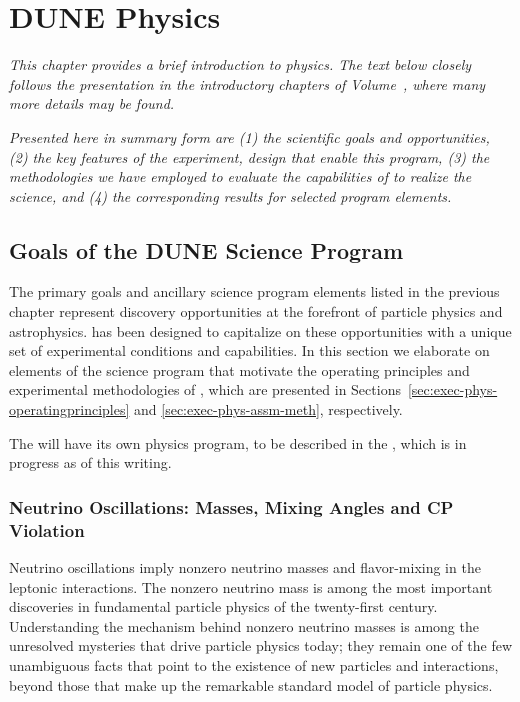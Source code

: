 \chapter{DUNE Physics}
\label{ch:exec-phys}


\textit{
This chapter provides a brief introduction to  physics.  The text below closely follows the presentation in the introductory chapters of Volume~\volnumberphysics{}, 
where many more details may be found.}


\textit{Presented here in summary form are   
(1) the scientific goals and opportunities, 
(2) the key features of the experiment, 
design that enable this program, 
(3) the methodologies we have 
employed to evaluate the capabilities of  to realize 
the science, and
(4) the corresponding results for selected program elements. 
}  


\section{Goals of the DUNE Science Program}
\label{sec:exec-phys-key-goals}

The primary goals and ancillary science program elements listed in the previous 
chapter represent discovery opportunities at the forefront of particle physics and 
astrophysics.   has been designed to capitalize on these opportunities with 
a unique set of experimental conditions and capabilities.  In this section we 
elaborate on elements of the science program that motivate the operating principles   
and experimental methodologies of , which are presented in 
Sections~\ref{sec:exec-phys-operatingprinciples} and 
\ref{sec:exec-phys-assm-meth}, respectively.

The   will have its own physics program, to be described in the  , which is in progress as of this writing.


\subsection{Neutrino Oscillations: Masses, Mixing Angles and CP Violation}

Neutrino oscillations imply nonzero neutrino masses and flavor-mixing 
in the leptonic  interactions.  The nonzero neutrino mass is among the most important discoveries in fundamental 
particle physics of the twenty-first century. Understanding the mechanism 
behind nonzero neutrino masses is among the unresolved mysteries that 
drive particle physics today; they remain one of the few unambiguous 
facts that point to the existence of new particles and interactions, 
beyond those that make up the remarkable standard model of 
particle physics.

